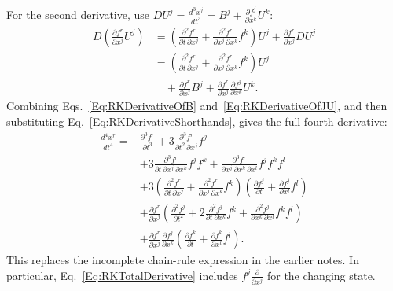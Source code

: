For the second derivative, use
$DU^j=\frac{d^3x^j}{dt^3}=B^j+\frac{\partial f^j}{\partial x^k}U^k$:
\begin{equation}\label{Eq:RKDerivativeOfJU}
\begin{aligned}
 D\left(\frac{\partial f^r}{\partial x^j}U^j\right)
 &=\left(\frac{\partial^2f^r}{\partial t\,\partial x^j}
        +\frac{\partial^2f^r}{\partial x^j\,\partial x^k}f^k\right)U^j
       +\frac{\partial f^r}{\partial x^j}DU^j\\
 &=\left(\frac{\partial^2f^r}{\partial t\,\partial x^j}
        +\frac{\partial^2f^r}{\partial x^j\,\partial x^k}f^k\right)U^j\\
 &\quad+\frac{\partial f^r}{\partial x^j}B^j
       +\frac{\partial f^r}{\partial x^j}\frac{\partial f^j}{\partial x^k}U^k.
\end{aligned}
\end{equation}
Combining Eqs.~\ref{Eq:RKDerivativeOfB} and~\ref{Eq:RKDerivativeOfJU},
and then substituting Eq.~\ref{Eq:RKDerivativeShorthands}, gives the full
fourth derivative:
\begin{equation}\label{Eq:RKFourthDerivativeExpanded}
\begin{aligned}
 \frac{d^4x^r}{dt^4}
 ={}&\frac{\partial^3f^r}{\partial t^3}
       +3\frac{\partial^3f^r}{\partial t^2\,\partial x^j}f^j\\
 &+3\frac{\partial^3f^r}{\partial t\,\partial x^j\,\partial x^k}f^j f^k
       +\frac{\partial^3f^r}{\partial x^j\,\partial x^k\,\partial x^l}f^j f^k f^l\\
 &+3\left(\frac{\partial^2f^r}{\partial t\,\partial x^j}
          +\frac{\partial^2f^r}{\partial x^j\,\partial x^k}f^k\right)
       \left(\frac{\partial f^j}{\partial t}
             +\frac{\partial f^j}{\partial x^l}f^l\right)\\
 &+\frac{\partial f^r}{\partial x^j}
       \left(\frac{\partial^2f^j}{\partial t^2}
          +2\frac{\partial^2f^j}{\partial t\,\partial x^k}f^k
          +\frac{\partial^2f^j}{\partial x^k\,\partial x^l}f^k f^l\right)\\
 &+\frac{\partial f^r}{\partial x^j}\frac{\partial f^j}{\partial x^k}
       \left(\frac{\partial f^k}{\partial t}
             +\frac{\partial f^k}{\partial x^l}f^l\right).
\end{aligned}
\end{equation}
This replaces the incomplete chain-rule expression in the earlier notes.
In particular, Eq.~\ref{Eq:RKTotalDerivative} includes
$ f^j\frac{\partial}{\partial x^j}$ for the changing state.


